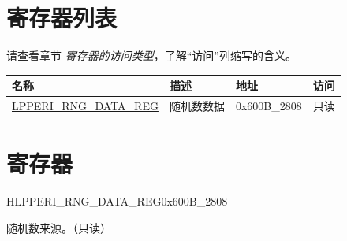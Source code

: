 \documentclass[main\_\_CN.tex]{subfiles}
\begin{document}
\section{寄存器列表}
请查看章节 \hyperref[glossary-access-types]{\textit{寄存器的访问类型}}，了解“访问”列缩写的含义。
\begin{table}[H]
    \centering
    \begin{tabular}{ | l | l | l | l |  }
    \hline
    \rowcolor{lightgray}
    \textbf{名称} & \textbf{描述} & \textbf{地址} & \textbf{访问} \\
    \hline
    \hyperref[regdesc:LPPERIRNGDATAREG]{LPPERI\_RNG\_DATA\_REG} & 随机数数据 & 0x600B\_2808 & 只读 \\
    \hline
    \end{tabular}
\end{table}




\section{寄存器}

\begin{register}{H}{LPPERI\_RNG\_DATA\_REG}{0x600B\_2808}\label{regdesc:LPPERIRNGDATAREG}
%
\regnewline%
\begin{regdesc}\begin{reglist}
\label{fielddesc:LPPERIRNGDATA}\item [LPPERI\_LPPERI\_RNG\_DATA] 随机数来源。（只读）
\end{reglist}\end{regdesc}
\end{register}
\end{document}
